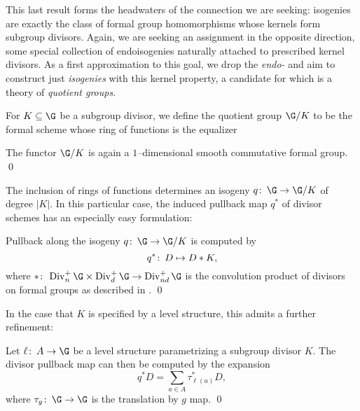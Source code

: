 This last result forms the headwaters of the connection we are seeking: isogenies are exactly the class of formal group homomorphisms whose kernels form subgroup divisors.  Again, we are seeking an assignment in the opposite direction, some special collection of endoisogenies naturally attached to prescribed kernel divisors.  As a first approximation to this goal, we drop the \emph{endo-} and aim to construct just \emph{isogenies} with this kernel property, a candidate for which is a theory of \textit{quotient groups}.

\begin{definition}
For $K \subseteq \G$ be a subgroup divisor, we define the quotient group $\G/K$ to be the formal scheme whose ring of functions is the equalizer
\begin{center}
\end{center}
\end{definition}

\begin{lemma}
The functor $\G/K$ is again a $1$--dimensional smooth commutative formal group. \qed
\end{lemma}

The inclusion of rings of functions determines an isogeny $q\co \G \to \G/K$ of degree $|K|$.  In this particular case, the induced pullback map $q^*$ of divisor schemes has an especially easy formulation:
\begin{lemma}
Pullback along the isogeny $q\co \G \to \G/K$ is computed by \[q^* \colon\thinspace D \mapsto D * K,\] where $*\co \Div_n^+ \G \times \Div_d^+ \G \to \Div_{nd}^+ \G$ is the convolution product of divisors on formal groups as described in . \qed
\end{lemma}

In the case that $K$ is specified by a level structure, this admits a further refinement:
\begin{corollary}
Let $\ell\co A \to \G$ be a level structure parametrizing a subgroup divisor $K$.  The divisor pullback map can then be computed by the expansion \[q^* D = \sum_{a \in A} \tau_{\ell(a)}^* D,\] where $\tau_g\co \G \to \G$ is the translation by $g$ map. \qed
\end{corollary}

